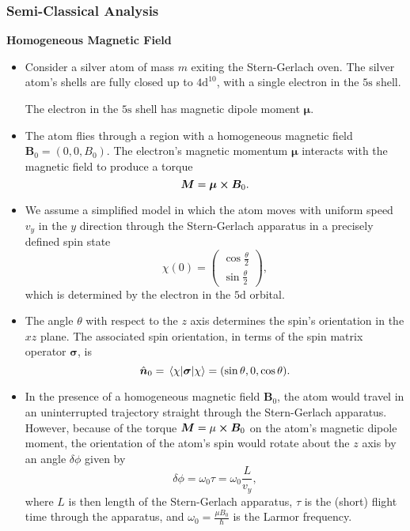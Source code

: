 \documentclass[11pt, a4paper]{article}
\newcommand{\SG}{Stern-Gerlach\xspace}
\renewcommand{\vec}[1]{\bm{#1}}  %
\newcommand{\uvec}[1]{\hat{\vec{#1}}}  %
\newcommand{\B}{\vec{B}}  %
\newcommand{\m}{\vec{\mu}}  %
\begin{document}
\subsubsection{Semi-Classical Analysis}
\textbf{Homogeneous Magnetic Field}
\begin{itemize}

    \item Consider a silver atom of mass $ m $ exiting the Stern-Gerlach oven. The silver atom's shells are fully closed up to $ 4 \mathrm{d}^{10} $, with a single electron in the $ 5 \mathrm{s} $ shell.

    The electron in the $ 5 \mathrm{s} $ shell has magnetic dipole moment $ \m $.

    \item The atom flies through a region with a homogeneous magnetic field $ \B_{0} = (0, 0, B_{0}) $. The electron's magnetic momentum $ \m $ interacts with the magnetic field to produce a torque
    \begin{equation*}
        \vec{M} = \m \cross \B_{0}.
    \end{equation*}

    \item We assume a simplified model in which the atom moves with uniform speed $ v_{y} $ in the $ y $ direction through the Stern-Gerlach apparatus in a precisely defined spin state
    \begin{equation*}
        \chi(0) = 
        \begin{pmatrix}
            \cos \frac{\theta}{2}\\[1mm]
            \sin \frac{\theta}{2}
        \end{pmatrix},
    \end{equation*}
    which is determined by the electron in the $ 5 \mathrm{d} $ orbital.

    \item The angle $ \theta $ with respect to the $ z $ axis determines the spin's orientation in the $ xz $ plane. The associated spin orientation, in terms of the spin matrix operator $ \vec{\sigma} $, is
    \begin{equation*}
        \uvec{n}_{0} = \mel{\chi}{\vec{\sigma}}{\chi} = (\sin \theta, 0, \cos \theta).
    \end{equation*}

    \item In the presence of a homogeneous magnetic field $ \B_{0} $, the atom would travel in an uninterrupted trajectory straight through the Stern-Gerlach apparatus. However, because of the torque $ \vec{M} = \mu \cross \B_{0} $ on the atom's magnetic dipole moment, the orientation of the atom's spin would rotate about the $ z $ axis by an angle $ \delta\phi $ given by
    \begin{equation*}
        \delta \phi = \omega_{0} \tau = \omega_{0} \frac{L}{v_{y}},
    \end{equation*}
    where $ L $ is then length of the \SG apparatus, $ \tau $ is the (short) flight time through the apparatus, and $ \omega_{0} = \frac{\mu B_{0}}{\hbar} $ is the Larmor frequency.


\end{itemize}
\end{document}
